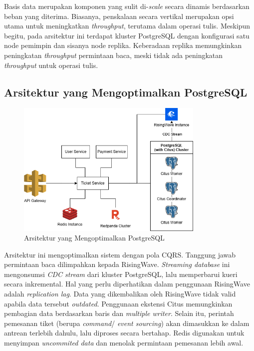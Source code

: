 Basis data merupakan komponen yang sulit di-\textit{scale} secara dinamis berdasarkan beban yang diterima. Biasanya, penskalaan secara vertikal merupakan opsi utama untuk meningkatkan \textit{throughput}, terutama dalam operasi tulis. Meskipun begitu, pada arsitektur ini terdapat kluster PostgreSQL dengan konfigurasi satu node pemimpin dan sisanya node replika. Keberadaan replika memungkinkan peningkatan \textit{throughput} permintaan baca, meski tidak ada peningkatan \textit{throughput} untuk operasi tulis.

\subsection{Arsitektur yang Mengoptimalkan PostgreSQL}

\begin{figure}[ht]
    \centering
    \includegraphics[width=0.8\textwidth]{resources/chapter-3/architecture-optimized.png}
    \caption{Arsitektur yang Mengoptimalkan PostgreSQL}
    \label{fig:optimized-architecture}
\end{figure}

Arsitektur ini mengoptimalkan sistem dengan pola CQRS. Tanggung jawab permintaan baca dilimpahkan kepada RisingWave. \textit{Streaming database} ini mengonsumsi \textit{CDC stream} dari kluster PostgreSQL, lalu memperbarui kueri secara inkremental. Hal yang perlu diperhatikan dalam penggunaan RisingWave adalah \textit{replication lag}. Data yang dikembalikan oleh RisingWave tidak valid apabila data tersebut \textit{outdated}. Penggunaan ekstensi Citus memungkinkan pembagian data berdasarkan baris dan \textit{multiple writer}. Selain itu, perintah pemesanan tiket (berupa \textit{command}/ \textit{event sourcing}) akan dimasukkan ke dalam antrean terlebih dahulu, lalu diproses secara bertahap. Redis digunakan untuk menyimpan \textit{uncommited data} dan menolak permintaan pemesanan lebih awal.

